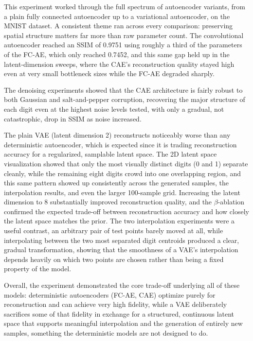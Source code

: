 \documentclass[10pt]{article}
\begin{document}
This experiment worked through the full spectrum of autoencoder variants, from a plain fully connected autoencoder up to a variational autoencoder, on the MNIST dataset. A consistent theme ran across every comparison: preserving spatial structure matters far more than raw parameter count. The convolutional autoencoder reached an SSIM of 0.9751 using roughly a third of the parameters of the FC-AE, which only reached 0.7452, and this same gap held up in the latent-dimension sweeps, where the CAE's reconstruction quality stayed high even at very small bottleneck sizes while the FC-AE degraded sharply.

The denoising experiments showed that the CAE architecture is fairly robust to both Gaussian and salt-and-pepper corruption, recovering the major structure of each digit even at the highest noise levels tested, with only a gradual, not catastrophic, drop in SSIM as noise increased.

The plain VAE (latent dimension 2) reconstructs noticeably worse than any deterministic autoencoder, which is expected since it is trading reconstruction accuracy for a regularized, samplable latent space. The 2D latent space visualization showed that only the most visually distinct digits (0 and 1) separate cleanly, while the remaining eight digits crowd into one overlapping region, and this same pattern showed up consistently across the generated samples, the interpolation results, and even the larger 100-sample grid. Increasing the latent dimension to 8 substantially improved reconstruction quality, and the $\beta$-ablation confirmed the expected trade-off between reconstruction accuracy and how closely the latent space matches the prior. The two interpolation experiments were a useful contrast, an arbitrary pair of test points barely moved at all, while interpolating between the two most separated digit centroids produced a clear, gradual transformation, showing that the smoothness of a VAE's interpolation depends heavily on which two points are chosen rather than being a fixed property of the model.

Overall, the experiment demonstrated the core trade-off underlying all of these models: deterministic autoencoders (FC-AE, CAE) optimize purely for reconstruction and can achieve very high fidelity, while a VAE deliberately sacrifices some of that fidelity in exchange for a structured, continuous latent space that supports meaningful interpolation and the generation of entirely new samples, something the deterministic models are not designed to do.
\end{document}
